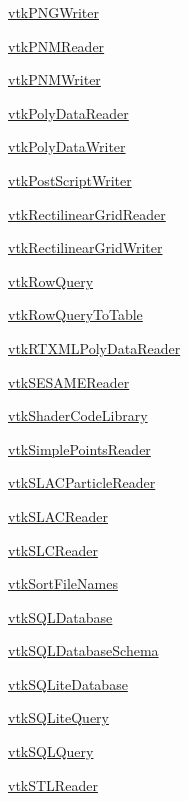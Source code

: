 \begin{DoxyItemize}
\item \hyperlink{vtkio_vtkpngwriter}{vtk\-P\-N\-G\-Writer}  
\item \hyperlink{vtkio_vtkpnmreader}{vtk\-P\-N\-M\-Reader}  
\item \hyperlink{vtkio_vtkpnmwriter}{vtk\-P\-N\-M\-Writer}  
\item \hyperlink{vtkio_vtkpolydatareader}{vtk\-Poly\-Data\-Reader}  
\item \hyperlink{vtkio_vtkpolydatawriter}{vtk\-Poly\-Data\-Writer}  
\item \hyperlink{vtkio_vtkpostscriptwriter}{vtk\-Post\-Script\-Writer}  
\item \hyperlink{vtkio_vtkrectilineargridreader}{vtk\-Rectilinear\-Grid\-Reader}  
\item \hyperlink{vtkio_vtkrectilineargridwriter}{vtk\-Rectilinear\-Grid\-Writer}  
\item \hyperlink{vtkio_vtkrowquery}{vtk\-Row\-Query}  
\item \hyperlink{vtkio_vtkrowquerytotable}{vtk\-Row\-Query\-To\-Table}  
\item \hyperlink{vtkio_vtkrtxmlpolydatareader}{vtk\-R\-T\-X\-M\-L\-Poly\-Data\-Reader}  
\item \hyperlink{vtkio_vtksesamereader}{vtk\-S\-E\-S\-A\-M\-E\-Reader}  
\item \hyperlink{vtkio_vtkshadercodelibrary}{vtk\-Shader\-Code\-Library}  
\item \hyperlink{vtkio_vtksimplepointsreader}{vtk\-Simple\-Points\-Reader}  
\item \hyperlink{vtkio_vtkslacparticlereader}{vtk\-S\-L\-A\-C\-Particle\-Reader}  
\item \hyperlink{vtkio_vtkslacreader}{vtk\-S\-L\-A\-C\-Reader}  
\item \hyperlink{vtkio_vtkslcreader}{vtk\-S\-L\-C\-Reader}  
\item \hyperlink{vtkio_vtksortfilenames}{vtk\-Sort\-File\-Names}  
\item \hyperlink{vtkio_vtksqldatabase}{vtk\-S\-Q\-L\-Database}  
\item \hyperlink{vtkio_vtksqldatabaseschema}{vtk\-S\-Q\-L\-Database\-Schema}  
\item \hyperlink{vtkio_vtksqlitedatabase}{vtk\-S\-Q\-Lite\-Database}  
\item \hyperlink{vtkio_vtksqlitequery}{vtk\-S\-Q\-Lite\-Query}  
\item \hyperlink{vtkio_vtksqlquery}{vtk\-S\-Q\-L\-Query}  
\item \hyperlink{vtkio_vtkstlreader}{vtk\-S\-T\-L\-Reader}  

\end{DoxyItemize}
